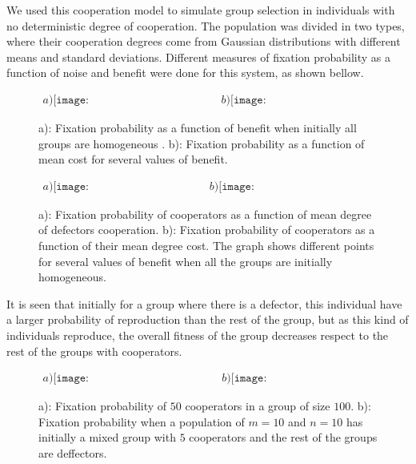     
  We used this cooperation model to simulate group selection in individuals with no deterministic degree  of cooperation. The population was divided in two types, where their cooperation degrees come from Gaussian distributions with different means and standard deviations. Different measures of fixation probability as a function of noise and benefit were done for this system, as shown bellow.   
 \begin{figure}[H]
\begin{center}$
\begin{array}{cc}
a)\texttt{[image: fixprobabilityVsBenefit.pdf]} &
b)\texttt{[image: fixprobabilityVsmean1Benefit.pdf]}
\end{array}$
\end{center}
\caption{a): Fixation probability as a function of benefit when initially all groups are homogeneous . b): Fixation probability as a function of mean cost for several values of benefit.}
\label{Fig8.1}
\end{figure}

\begin{figure}[H]
\begin{center}$
\begin{array}{cc}
a)\texttt{[image: fixprobabilityVsmean0.pdf]} &
b)\texttt{[image: fixprobabilityVsmean1Sigmas.pdf]}
\end{array}$
\end{center}
\caption{a): Fixation probability of cooperators as a function of mean degree of defectors cooperation. b): Fixation probability of cooperators as a function of their mean degree cost. The graph shows different points for several values of benefit when all the groups are initially homogeneous.}
\label{Fig8.2}
\end{figure}
It  is seen that initially for a group where there is a defector, this individual have a larger probability of reproduction than the rest of the group, but as this kind of individuals reproduce, the overall fitness of the group decreases respect to the rest of the groups with cooperators.
\begin{figure}[H]
\begin{center}$
\begin{array}{cc}
a)\texttt{[image: probaCoopeSinglegroup.pdf]} &
b)\texttt{[image: probaCoomixedGroup.pdf]}
\end{array}$
\end{center}
\caption{a): Fixation probability of $50$ cooperators in a group of size $100$. b): Fixation probability when a population of $m=10$ and $n=10$ has initially a mixed group with $5$ cooperators and the rest of the groups are deffectors.}
\label{Fig8.3}
\end{figure}


